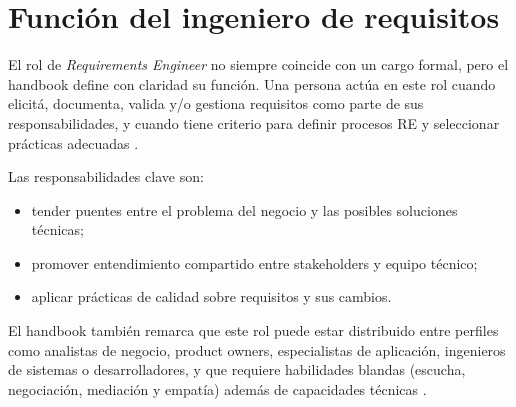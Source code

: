 \section{Funci\'on del ingeniero de requisitos}
El rol de \textit{Requirements Engineer} no siempre coincide con un cargo formal, pero el handbook define con claridad su funci\'on. Una persona act\'ua en este rol cuando elicit\'a, documenta, valida y/o gestiona requisitos como parte de sus responsabilidades, y cuando tiene criterio para definir procesos RE y seleccionar pr\'acticas adecuadas \cite[p.~14]{cpre}.

Las responsabilidades clave son:
\begin{itemize}[leftmargin=1.2em]
  \item tender puentes entre el problema del negocio y las posibles soluciones t\'ecnicas;
  \item promover entendimiento compartido entre stakeholders y equipo t\'ecnico;
  \item aplicar pr\'acticas de calidad sobre requisitos y sus cambios.
\end{itemize}

El handbook tambi\'en remarca que este rol puede estar distribuido entre perfiles como analistas de negocio, product owners, especialistas de aplicaci\'on, ingenieros de sistemas o desarrolladores, y que requiere habilidades blandas (escucha, negociaci\'on, mediaci\'on y empat\'ia) adem\'as de capacidades t\'ecnicas \cite[pp.~14--15]{cpre}.
